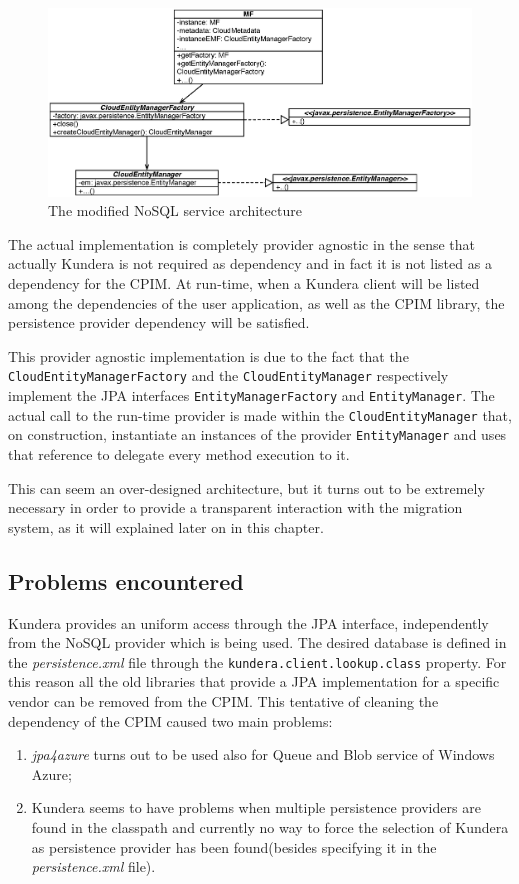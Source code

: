 \begin{figure}[tbh]
  \centering
  \includegraphics[width=14cm]{images/cpim_nosql_kundera}
  \caption{The modified NoSQL service architecture}
  \label{fig:cpim-kundera}
\end{figure}

\noindent The actual implementation is completely provider agnostic in the sense that actually Kundera is not required as dependency and in fact it is not listed as a dependency for the CPIM. At run-time, when a Kundera client will be listed among the dependencies of the user application, as well as the CPIM library, the persistence provider dependency will be satisfied.

\noindent This provider agnostic implementation is due to the fact that the \texttt{CloudEntityManagerFactory} and the \texttt{CloudEntityManager} respectively implement the JPA interfaces \texttt{EntityManagerFactory}  and \texttt{EntityManager}.
The actual call to the run-time provider is made within the \texttt{CloudEntityManager} that, on construction, instantiate an instances of the provider \texttt{EntityManager} and uses that reference to delegate every method execution to it.

\noindent This can seem an over-designed architecture, but it turns out to be extremely necessary in order to provide a transparent interaction with the migration system, as it will explained later on in this chapter.

\subsection{Problems encountered}
Kundera provides an uniform access through the JPA interface, independently from the NoSQL provider which is being used. The desired database is defined in the \textit{persistence.xml} file through the \texttt{kundera.client.lookup.class} property. For this reason all the old libraries that provide a JPA implementation for a specific vendor can be removed from the CPIM. 
This tentative of cleaning the dependency of the CPIM caused two main problems:
\begin{enumerate}
\item \textit{jpa4azure} turns out to be used also for Queue and Blob service of Windows Azure;
\item Kundera seems to have problems when multiple persistence providers are found in the classpath and currently no way to force the selection of Kundera as persistence provider has been found(besides specifying it in the \textit{persistence.xml} file).
\end{enumerate} 

